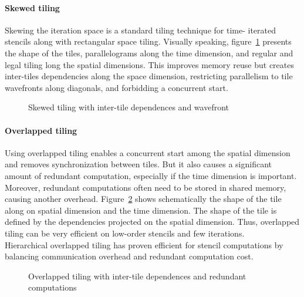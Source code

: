 \documentclass[a4paper,11pt]{article}
\begin{document}
  \paragraph{Skewed tiling} Skewing the iteration space is a standard tiling technique for time-
  iterated stencils along with rectangular space tiling. Visually speaking, figure~\ref{skewed-tiling}
  presents the shape of the tiles, parallelograms along the time dimension, and regular and legal
  tiling long the spatial dimensions. This improves memory reuse but creates inter-tiles
  dependencies along the space dimension, restricting parallelism to tile wavefronts along
  diagonals, and forbidding a concurrent start.

  \vspace{1cm}
  \begin{figure}[h]
    \begin{center}
     
    \end{center}
   \caption{Skewed tiling with inter-tile dependences and wavefront}
   \label{skewed-tiling}
  \end{figure}
  
  \paragraph{Overlapped tiling} Using overlapped tiling enables a concurrent start among the spatial 
  dimension and removes synchronization between tiles. But it also causes a significant
amount of redundant computation, especially if the time dimension is important. Moreover, 
redundant computations often need to be stored in shared memory, causing another
overhead. Figure~\ref{over-tiling} shows schematically the shape of the tile along on spatial dimension
and the time dimension. The shape of the tile is defined by the dependencies projected on
the spatial dimension. Thus, overlapped tiling can be very efficient on low-order stencils
and few iterations. \\
Hierarchical overlapped tiling \cite{zhou_hierarchical_2012} has proven efficient for 
stencil computations by balancing communication overhead and redundant computation cost.

  \vspace{1cm}
  \begin{figure}[h]
   
   \caption{Overlapped tiling with inter-tile dependences and redundant computations}
   \label{over-tiling}
  \end{figure}
 
\end{document}
